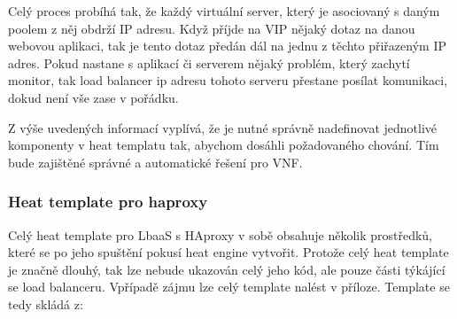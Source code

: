 Celý proces probíhá tak, že každý virtuální server, který je asociovaný s daným poolem z něj obdrží IP adresu. Když příjde na VIP nějaký dotaz na danou webovou aplikaci, tak je tento dotaz předán dál na jednu z těchto přiřazeným IP adres. Pokud nastane s aplikací či serverem nějaký problém, který zachytí monitor, tak load balancer ip adresu tohoto serveru přestane posílat komunikaci, dokud není vše zase v pořádku. 

Z výše uvedených informací vyplívá, že je nutné správně nadefinovat jednotlivé komponenty v heat templatu tak, abychom dosáhli požadovaného chování. Tím bude zajištěné správné a automatické řešení pro VNF.

\subsubsection{Heat template pro haproxy}

Celý heat template pro LbaaS s HAproxy v sobě obsahuje několik prostředků, které se po jeho spuštění pokusí heat engine vytvořit. Protože celý heat template je značně dlouhý, tak lze nebude ukazován celý jeho kód, ale pouze části týkájící se load balanceru. Vpřípadě zájmu lze celý template nalést v příloze. Template se tedy skládá z:

